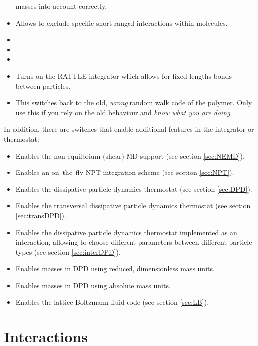 \begin{itemize}
  masses into account correctly.
\item {} Allows to exclude specific short ranged
  interactions within molecules.
\item {} 
\item {} 
\item {} 
\item {} Turns on the RATTLE integrator which
  allows for fixed lengths bonds between particles. 
\item {} This switches back to the old,
\emph{wrong} random walk code of the polymer. Only use this if you
rely on the old behaviour and \emph{know what you are doing}.
\end{itemize}

In addition, there are switches that enable additional features in the
integrator or thermostat:
\begin{itemize}
\item {} Enables the non-equilbrium (shear) MD support
  (see section \vref{sec:NEMD}).
\item {} Enables an on--the--fly NPT integration scheme
  (see section \vref{sec:NPT}).
\item {} Enables the dissipative particle dynamics
  thermostat (see section \vref{sec:DPD}).
\item {} Enables the transversal dissipative
  particle dynamics thermostat (see section \vref{sec:transDPD}).
\item {} Enables the dissipative
  particle dynamics thermostat implemented as an interaction,
  allowing to choose different parameters between different particle
  types (see section \vref{sec:interDPD}).
\item {} Enables masses in DPD using reduced,
  dimensionless mass units.
\item {} Enables masses in DPD using absolute
  mass units.
\item {} Enables the lattice-Boltzmann fluid code (see
  section \vref{sec:LB}).
\end{itemize}

\section{Interactions}


